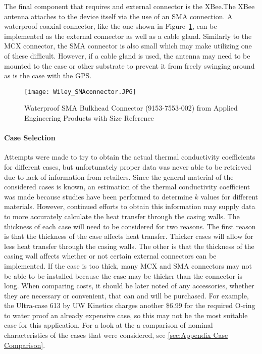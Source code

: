 The final component that requires and external connector is the XBee.The XBee antenna attaches to the device itself via the use of an SMA connection. A
waterproof coaxial connector, like the one shown in Figure~\ref{fig:SMA}, can be implemented as the external connector as well as a cable gland. 
Similarly to the MCX connector, the SMA connector is also small which may make utilizing one of these difficult. However, if a cable gland is used, the
antenna may need to be mounted to the case or other substrate to prevent it from freely swinging around as is the case with the GPS.
\begin{figure}[ht]
\centering
\texttt{[image: Wiley\_SMAconnector.JPG]}
\caption{\label{fig:SMA} Waterproof SMA Bulkhead Connector (9153-7553-002) from Applied Engineering Products with Size Reference}
\end{figure}



\paragraph {Case Selection} Attempts were made to try to obtain the actual thermal conductivity coefficients for different cases, but unfortunately proper
data was never able to be retrieved due to lack of information from retailers. Since the general material of the considered cases is known, an
estimation of the thermal conductivity coefficient was made because studies have been performed to determine $k$ values for different materials. 
However, continued efforts to obtain this information may supply data to more accurately calculate the heat transfer through the casing walls. The
thickness of each case will need to be considered for two reasons. The first reason is that the thickness of the case affects heat transfer. Thicker
cases will allow for less heat transfer through the casing walls. The other is that the thickness of the casing wall affects whether or not certain
external connectors can be implemented. If the case is too thick, many MCX and SMA connectors may not be able to be installed because the case may
be thicker than the connector is long. When comparing costs, it should be later noted of any accessories, whether they are necessary or
convenient, that can and will be purchased. For example, the Ultra-case 613 by UW Kinetics charges another \$6.99 for the required O-ring to
water proof an already expensive case, so this may not be the most suitable case for this application. For a look at the a comparison of nominal
characteristics of the cases that were considered, see \ref{sec:Appendix Case Comparison}.

